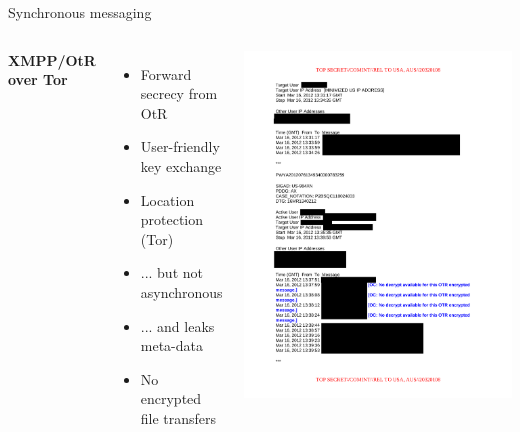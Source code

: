 \documentclass[fleqn,xcolor={usenames,dvipsnames}]{beamer}
\begin{document}
\begin{frame}{Synchronous messaging}
 \begin{columns}[T]
 \smallskip
  \begin{center}
    {\bf XMPP/OtR over Tor}
  \end{center}
  \begin{itemize}
  \item Forward secrecy from OtR
  \item User-friendly key exchange
  \item Location protection (Tor)
  \item ... but not asynchronous
  \item ... and leaks meta-data %
  \item No encrypted file transfers
  \end{itemize}


\includegraphics[page=2,scale=0.4,trim=70 0 0 20, clip]{../pics/nsa_v_otr}
\end{columns}
\end{frame}
\end{document}
